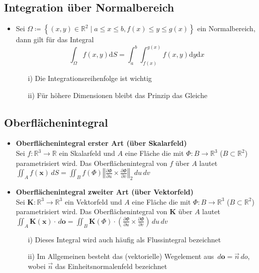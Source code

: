 \documentclass[a3paper, 11pt, landscape]{scrartcl}
\newcommand{\diff}{\,d}
\begin{document}
\begin{multicols*}{3}
	\subsection{Integration über Normalbereich}
	\begin{itemize}
	    \item Sei $\Omega \coloneqq \left\{(x, y) \in \mathbb{R}^2 \mid a \le x \le b, f(x) \le y \le g(x) \right\}$ ein Normalbereich, dann gilt für das Integral
		\begin{equation*}
			\int_{\Omega}f(x, y)\text{d}S=\int_{a}^{b}\int_{f(x)}^{g(x)}f(x, y)\text{d}y \text{d}x
		\end{equation*}
		\begin{enumerate}{Anmerkungen}
			\item [i)] Die Integrationsreihenfolge ist wichtig
			\item [ii)] Für höhere Dimensionen bleibt das Prinzip das Gleiche
		\end{enumerate}
	\end{itemize}
	
	\subsection{Oberflächenintegral}
					\begin{itemize}
						\item \textbf{Oberflächenintegral erster Art (über Skalarfeld)}\\
						Sei $f: \mathbb{R}^3 \rightarrow \mathbb{R}$ ein Skalarfeld und $A$ eine Fläche die mit $\Phi: B \rightarrow \mathbb{R}^3$ ($B \subset \mathbb{R}^2$) parametrisiert wird. Das Oberflächenintegral von $f$ über $A$ lautet
						$\iint_A f(\textbf{x}) \diff S = \iint_B f(\Phi) \left \Vert \frac{\partial \Phi}{\partial u} \times \frac{\partial \Phi}{\partial v} \right \Vert_2 \diff u \diff v$\\
						\item \textbf{Oberflächenintegral zweiter Art (über Vektorfeld)}\\
						Sei $\textbf{K}: \mathbb{R}^3 \rightarrow \mathbb{R}^3$ ein Vektorfeld und $A$ eine Fläche die mit $\Phi: B \rightarrow \mathbb{R}^3$ ($B \subset \mathbb{R}^2$) parametrisiert wird. Das Oberflächenintegral von $\textbf{K}$ über $A$ lautet
						$\iint_A \textbf{K}(\textbf{x})  \cdot \diff \textbf{o} = \iint_B \textbf{K}(\Phi) \cdot \left ( \frac{\partial \Phi}{\partial u} \times \frac{\partial \Phi}{\partial v} \right) \diff u \diff v$
						\begin{itemize}
					    	\item[i)] Dieses Integral wird auch häufig als Flussintegral bezeichnet
							\item[ii)] Im Allgemeinen besteht das (vektorielle) Wegelement aus $\diff \textbf{o}=\vec{n} \diff o $, wobei $\vec{n}$ das Einheitsnormalenfeld bezeichnet
						\end{itemize}
					\end{itemize}
	

\end{multicols*}
\end{document}
